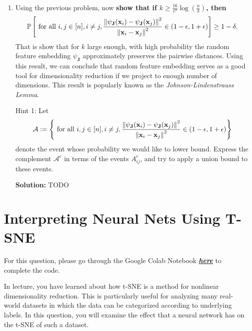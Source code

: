 \documentclass{article}
\newcommand{\Question}[1]{\Large \section{ #1 } \normalsize}
\newcommand{\mat}[1]{\mathbf{#1}}
\renewcommand{\vec}[1]{\boldsymbol{\mathbf{#1}}}
\newenvironment{solution}{\color{blue} \smallskip \textbf{Solution:}}{}
\begin{document}
\begin{enumerate}
\newpage
\item Using the previous problem, now {\bf show that if 
$k \geq \frac{16}{\epsilon^2} \log\left(\frac{n}{\delta}\right)$, then }
\begin{align*}
	\mathbb{P}\left[ \text{ for all } i, j \in [\num], i\neq j, 
	\frac{\norm{\psi_{\mat J}(\vec x_i) - \psi_{\mat J}(\vec x_j)}^2}{\norm{\vec x_i - \vec x_j}^2} \in (1-\epsilon, 1+\epsilon) \right] 
	\geq 1-\delta.
\end{align*}
That is show that for $k$ large enough, with high probability the random feature embedding
$\psi_{\mat J}$ approximately preserves the pairwise distances.
Using this result, we can conclude that random feature embedding serves as a good tool for dimensionality reduction 
if we project to enough number of dimensions.
This result is popularly known as the \emph{Johnson-Lindenstrauss Lemma}.

Hint 1: Let 
\begin{align*}
		\mathcal{A} := \left\{\text{ for all } i, j \in [\num], i\neq j, 
	\frac{\norm{\psi_{\mat J}(\vec x_i) - \psi_{\mat J}(\vec x_j)}^2}{\norm{\vec x_i - \vec x_j}^2} \in (1-\epsilon, 1+\epsilon) \right\}
\end{align*}
denote the event whose probability we would like to lower bound. Express the complement $\mathcal{A}^c$ in terms of the events $A_{ij}^c$, and try to apply a union bound to these events.

\begin{solution}
    TODO
\end{solution}
\end{enumerate}

\newpage
\Question{Interpreting Neural Nets Using T-SNE}
For this question, please go through the Google Colab Notebook \href{https://colab.research.google.com/drive/1yiRHfxSMqqzzE-3z7Omqhk_-YV37Bily?usp=sharing}{\textbf{\emph{here}}} to complete the code. 

In lecture, you have learned about how t-SNE is a method for nonlinear dimensionality reduction. This is particularly useful for analyzing many real-world datasets in which the data can be categorized according to underlying labels. In this question, you will examine the effect that a neural network has on the t-SNE of such a dataset.
\end{document}
